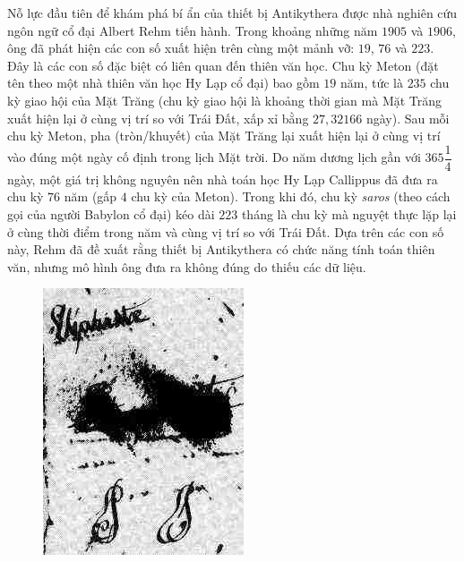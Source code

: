 \begin{multicols}{2}
	Nỗ lực đầu tiên để khám phá bí ẩn của thiết bị Antikythera được nhà nghiên cứu ngôn ngữ cổ đại Albert Rehm tiến hành. Trong khoảng những năm $1905$ và $1906$, ông đã phát hiện các con số xuất hiện trên cùng một mảnh vỡ: $19$, $76$ và $223$. Đây là các con số đặc biệt có liên quan đến thiên văn học. Chu kỳ Meton (đặt tên theo một nhà thiên văn học Hy Lạp cổ đại) bao gồm $19$ năm, tức là $235$ chu kỳ giao hội của Mặt Trăng (chu kỳ giao hội là khoảng thời gian mà Mặt Trăng xuất hiện lại ở cùng vị trí so với Trái Đất, xấp xỉ bằng $27{,}32166$ ngày). Sau mỗi chu kỳ Meton, pha (tròn/khuyết) của Mặt Trăng lại xuất hiện lại ở cùng vị trí vào đúng một ngày cố định trong lịch Mặt trời. Do năm dương lịch gần với $365\dfrac{1}{4}$ ngày, một giá trị không nguyên nên nhà toán học Hy Lạp Callippus đã đưa ra chu kỳ $76$ năm (gấp $4$ chu kỳ của Meton). Trong khi đó, chu kỳ \textit{saros} (theo cách gọi của người Babylon cổ đại) kéo dài $223$ tháng là chu kỳ mà nguyệt thực lặp lại ở cùng thời điểm trong năm và cùng vị trí so với Trái Đất. Dựa trên các con số này, Rehm đã đề xuất rằng thiết bị Antikythera có chức năng tính toán thiên văn, nhưng mô hình ông đưa ra không đúng do thiếu các dữ liệu.
	\begin{figure}[H]
		\vspace*{-5pt}
		\centering
		\captionsetup{labelformat= empty, justification=centering}
		\includegraphics[width= 0.73\linewidth]{3}

\end{figure}
\end{multicols}
